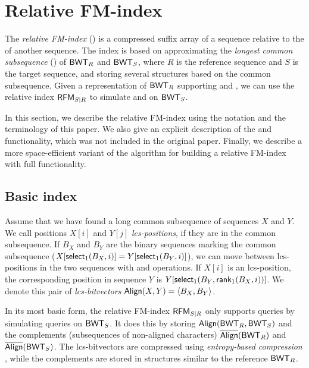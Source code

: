 

\section{Relative FM-index}

The \emph{relative FM-index} (\RFM) \cite{Belazzougui2014} is a compressed
suffix array of a sequence relative to the \CSA{} of another sequence.
The index is based on approximating the
\emph{longest common subsequence} (\LCS) of $\mathsf{BWT}_{R}$ and $\mathsf{BWT}_{S}$,
where $R$ is the reference sequence and $S$ is the target sequence, and
storing several structures based on the common subsequence. Given a
representation of $\mathsf{BWT}_{R}$ supporting \rank{} and \select{}, we can use the
relative index $\mathsf{RFM}_{S \mid R}$ to simulate \rank{} and \select{} on
$\mathsf{BWT}_{S}$.

In this section, we describe the relative FM-index using the notation and the
terminology of this paper. We also give an explicit description of the
\locate{} and \extract{} functionality, which was not included in the original
paper. Finally, we describe a more space-efficient variant of the algorithm
for building a relative FM-index with full functionality.

\subsection{Basic index}

Assume that we have found a long common subsequence of sequences $X$ and $Y$.
We call positions $X[i]$ and $Y[j]$ \emph{lcs-positions}, if they are in the
common subsequence. If $B_{X}$ and $B_{Y}$ are the binary sequences marking
the common subsequence ($X[\textsf{select}_1(B_{X},i)] = Y[\textsf{select}_1(B_{Y},i)]$), we
can move between lcs-positions in the two sequences with \rank{} and \select{}
operations. If $X[i]$ is an lcs-position, the corresponding position in
sequence $Y$ is $Y[\mathsf{select}_{1}(B_{Y}, \mathsf{rank}_{1}(B_{X}, i))]$. We denote this
pair of \emph{lcs-bitvectors} $\mathsf{Align}(X,Y) = \langle B_X,B_Y \rangle$.

In its most basic form, the relative FM-index $\mathsf{RFM}_{S \mid R}$ only supports
\find{} queries by simulating \rank{} queries on $\mathsf{BWT}_{S}$. It does this by
storing $\mathsf{Align}(\textsf{BWT}_{R},\textsf{BWT}_{S})$ and the complements (subsequences of
non-aligned characters) $\overline{ \mathsf{Align} }(\mathsf{BWT}_{R})$ and $\overline{ \mathsf{Align} }(\mathsf{BWT}_{S})$. The
lcs-bitvectors are compressed using \emph{entropy-based compression}
\cite{Raman2007}, while the complements are stored in structures similar to
the reference $\mathsf{BWT}_{R}$.

